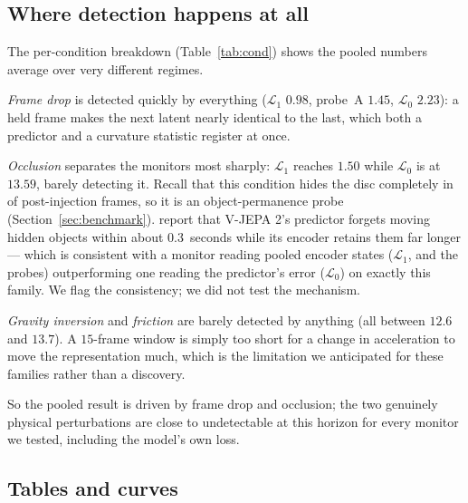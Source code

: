 \subsection{Where detection happens at all}

The per-condition breakdown (Table~\ref{tab:cond}) shows the pooled numbers
average over very different regimes.

\emph{Frame drop} is detected quickly by everything ($\mathcal{L}_1$ \RMTA{}
$0.98$, probe~A $1.45$, $\mathcal{L}_0$ $2.23$): a held frame makes the next
latent nearly identical to the last, which both a predictor and a curvature
statistic register at once.

\emph{Occlusion} separates the monitors most sharply: $\mathcal{L}_1$ reaches
$1.50$ while $\mathcal{L}_0$ is at $13.59$, barely detecting it. Recall that
this condition hides the disc completely in \lgwOccFullyHidden{} of
post-injection frames, so it is an object-permanence probe
(Section~\ref{sec:benchmark}). \citet{xie2026tracking} report that V-JEPA 2's
predictor forgets moving hidden objects within about $0.3$~seconds while its
encoder retains them far longer --- which is consistent with a monitor reading
pooled encoder states ($\mathcal{L}_1$, and the probes) outperforming one
reading the predictor's error ($\mathcal{L}_0$) on exactly this family. We
flag the consistency; we did not test the mechanism.

\emph{Gravity inversion} and \emph{friction} are barely detected by anything
(all \RMTA{} between $12.6$ and $13.7$). A $15$-frame window is simply too short
for a change in acceleration to move the representation much, which is the
limitation we anticipated for these families rather than a discovery.

So the pooled result is driven by frame drop and occlusion; the two genuinely
physical perturbations are close to undetectable at this horizon for every
monitor we tested, including the model's own loss.

\subsection{Tables and curves}

\begin{table}[t]
\centering
\small

\caption{Detection latency per monitor at the pre-registered operating point
(per-frame false-alarm rate matched at $1\%$). \emph{Lift} is detection rate
minus held-out clip-level false-alarm rate; no monitor is flagged as firing at
chance. \RMTA{} is the restricted mean detection latency in frames, lower being
faster, with a percentile bootstrap interval.}
\label{tab:tta}
\end{table}

